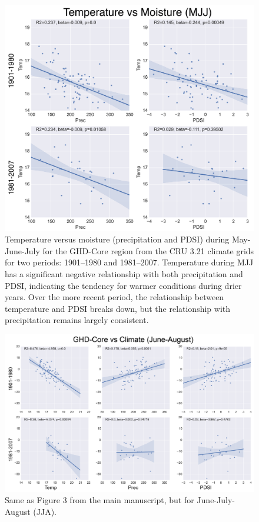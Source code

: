 \documentclass[12pt]{article}
\begin{document}
\begin{figure}
\center
\includegraphics[width=1.0\columnwidth,scale=2]{SUPP_fig_11_temp_vs_moist_MJJ.png}
\caption{Temperature versus moisture (precipitation and PDSI) during May-June-July for the GHD-Core region from the CRU 3.21 climate grids for two periods: 1901--1980 and 1981--2007. Temperature during MJJ has a significant negative relationship with both precipitation and PDSI, indicating the tendency for warmer conditions during drier years. Over the more recent period, the relationship between temperature and PDSI breaks down, but the relationship with precipitation remains largely consistent.}
\end{figure}

\begin{figure}
\center
\includegraphics[width=1.0\columnwidth,scale=2]{SUPP_fig_12_JJA_clim_regplots.png}
\caption{Same as Figure 3 from the main manuscript, but for June-July-August (JJA).}
\end{figure}
\end{document}
